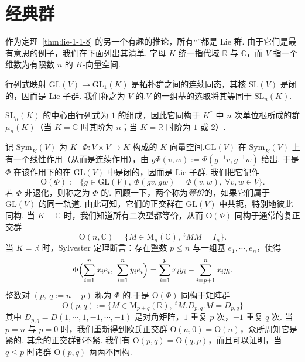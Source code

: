 \section{经典群}\label{sec:lie-1-2}
作为定理~\ref{thm:lie-1-1-8} 的另一个有趣的推论，所有``''都是 Lie 群. 由于它们是最有意思的例子，我们在下面列出其清单. 字母 $K$ 统一指代域 $\mathbb R$ 与 $\mathbb C$，而 $V$ 指一个维数为有限数 $n$ 的 $K$-向量空间.
\begin{numpara}[特殊线性群]\label{np:lie-1-2-1}
行列式映射 $\mathrm{GL}(V)\to\mathrm{GL}_1(K)$ 是拓扑群之间的连续同态，其核 $\mathrm{SL}(V)$ 是闭的，因而是 Lie 子群. 我们称之为 $V$ 的.$V$ 的一组基的选取将其等同于 $\mathrm{SL}_n(K)$.
\end{numpara}
\begin{exercise*}
$\mathrm{SL}_n(K)$ 的中心由行列式为 $1$ 的组成，因此它同构于 $K^*$ 中 $n$ 次单位根所成的群 $\mu_n(K)$（当 $K=\mathbb C$ 时其阶为 $n$；当 $K=\mathbb R$ 时阶为 $1$ 或 $2$）.
\end{exercise*}
\begin{numpara}[正交群]\label{np:lie-1-2-2}
记 $\mathrm{Sym}_K(V)$ 为 $K$- $\Phi:V\times V\to K$ 构成的 $K$-向量空间.$\mathrm{GL}(V)$ 在 $\mathrm{Sym}_K(V)$ 上有一个线性作用（从而是连续作用），由 $g\Phi(v,w):=\Phi(g^{-1}v,g^{-1}w)$ 给出. 于是 $\Phi$ 在该作用下的在 $\mathrm{GL}(V)$ 中是闭的，因而是 Lie 子群. 我们把它记作
\[
\mathrm{O}(\Phi):=\{g\in\mathrm{GL}(V),\ \Phi(gv,gw)=\Phi(v,w),\ \forall v,w\in V\}.
\]
若 $\Phi$ 非退化，则称之为 $\Phi$ 的.
回顾一下，两个称为\emph{等价}的，如果它们属于 $\mathrm{GL}(V)$ 的同一轨道. 由此可知，它们的正交群在 $\mathrm{GL}(V)$ 中共轭，特别地彼此同构. 当 $K=\mathbb C$ 时，我们知道所有二次型都等价，从而 $\mathrm{O}(\Phi)$ 同构于通常的复正交群
\[
\mathrm{O}(n,\mathbb C)=\{M\in\mathrm{M}_n(\mathbb C),\ ^tMM=I_n\}.
\]
当 $K=\mathbb R$ 时，Sylvester 定理断言：存在整数 $p\leqslant n$ 与一组基 $e_1,\cdots,e_n$，使得
\[
\Phi\Bigl(\sum_{i=1}^{n}x_ie_i,\ \sum_{i=1}^{n}y_ie_i\Bigr)=\sum_{i=1}^{p}x_iy_i-\sum_{i=p+1}^{n}x_iy_i.
\]
整数对 $(p,\ q:=n-p)$ 称为 $\Phi$ 的.于是 $\mathrm{O}(\Phi)$ 同构于矩阵群
\[
\mathrm{O}(p,q):=\{M\in\mathrm{M}_{p+q}(\mathbb R),\ ^tM.D_{p,q}.M=D_{p,q}\}
\]
其中 $D_{p,q}=D(1,\cdots,1,-1,\cdots,-1)$ 是对角矩阵，$1$ 重复 $p$ 次，$-1$ 重复 $q$ 次. 当 $p=n$ 与 $p=0$ 时，我们重新得到欧氏正交群 $\mathrm{O}(n,0)=\mathrm{O}(n)$，众所周知它是紧的. 其余的正交群都不紧. 我们有 $\mathrm{O}(p,q)=\mathrm{O}(q,p)$，而且可以证明，当 $q\leqslant p$ 时诸群 $\mathrm{O}(p,q)$ 两两不同构.
\end{numpara}
